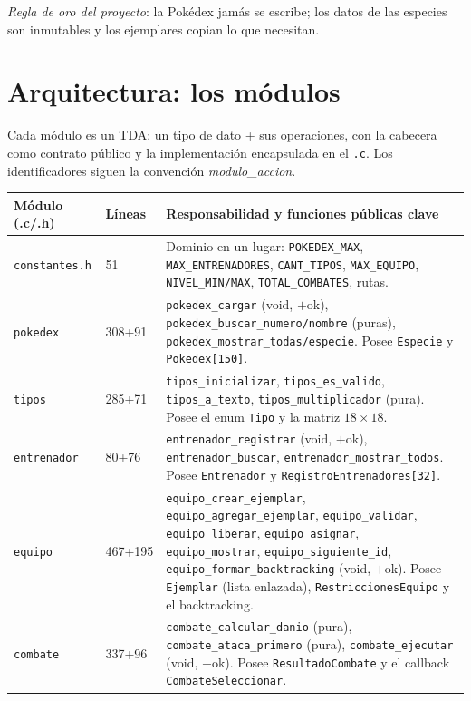 \documentclass[11pt,a4paper]{article}
\begin{document}
\emph{Regla de oro del proyecto}: la Pok\'edex jam\'as se escribe; los datos de
las especies son inmutables y los ejemplares copian lo que necesitan.

\section{Arquitectura: los m\'odulos}
Cada m\'odulo es un TDA: un tipo de dato + sus operaciones, con la cabecera
como contrato p\'ublico y la implementaci\'on encapsulada en el \texttt{.c}.
Los identificadores siguen la convenci\'on \emph{modulo\_accion}.

\begin{longtable}{p{3.2cm} p{4.6cm} p{7.4cm}}
\toprule
\textbf{M\'odulo (.c/.h)} & \textbf{L\'ineas} & \textbf{Responsabilidad y funciones p\'ublicas clave} \\
\midrule
\texttt{constantes.h} & 51 & Dominio en un lugar: \texttt{POKEDEX\_MAX}, \texttt{MAX\_ENTRENADORES}, \texttt{CANT\_TIPOS}, \texttt{MAX\_EQUIPO}, \texttt{NIVEL\_MIN/MAX}, \texttt{TOTAL\_COMBATES}, rutas. \\
\texttt{pokedex} & 308+91 & \texttt{pokedex\_cargar} (void, $+$ok), \texttt{pokedex\_buscar\_numero/nombre} (puras), \texttt{pokedex\_mostrar\_todas/especie}. Posee \texttt{Especie} y \texttt{Pokedex[150]}. \\
\texttt{tipos} & 285+71 & \texttt{tipos\_inicializar}, \texttt{tipos\_es\_valido}, \texttt{tipos\_a\_texto}, \texttt{tipos\_multiplicador} (pura). Posee el enum \texttt{Tipo} y la matriz $18\times18$. \\
\texttt{entrenador} & 80+76 & \texttt{entrenador\_registrar} (void, $+$ok), \texttt{entrenador\_buscar}, \texttt{entrenador\_mostrar\_todos}. Posee \texttt{Entrenador} y \texttt{RegistroEntrenadores[32]}. \\
\texttt{equipo} & 467+195 & \texttt{equipo\_crear\_ejemplar}, \texttt{equipo\_agregar\_ejemplar}, \texttt{equipo\_validar}, \texttt{equipo\_liberar}, \texttt{equipo\_asignar}, \texttt{equipo\_mostrar}, \texttt{equipo\_siguiente\_id}, \texttt{equipo\_formar\_backtracking} (void, $+$ok). Posee \texttt{Ejemplar} (lista enlazada), \texttt{RestriccionesEquipo} y el backtracking. \\
\texttt{combate} & 337+96 & \texttt{combate\_calcular\_danio} (pura), \texttt{combate\_ataca\_primero} (pura), \texttt{combate\_ejecutar} (void, $+$ok). Posee \texttt{ResultadoCombate} y el callback \texttt{CombateSeleccionar}. \\

\end{longtable}
\end{document}
